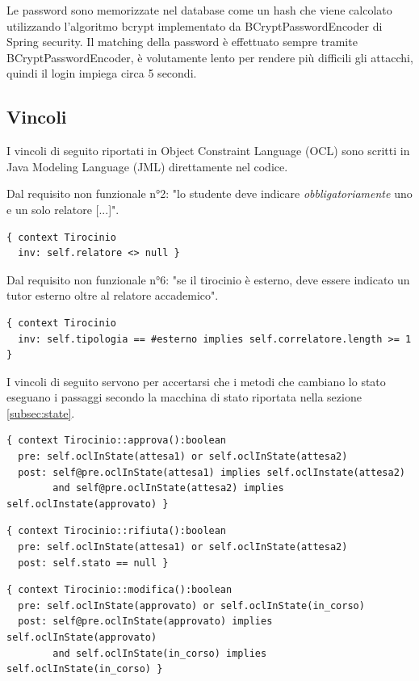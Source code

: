 \documentclass[12pt]{article}
\begin{document}
Le password sono memorizzate nel database come un hash che viene calcolato utilizzando l'algoritmo bcrypt implementato da BCryptPasswordEncoder di Spring security. Il matching della password è effettuato sempre tramite BCryptPasswordEncoder, è volutamente lento per rendere più difficili gli attacchi, quindi il login impiega circa 5 secondi.


\subsection{Vincoli}

I vincoli di seguito riportati in Object Constraint Language (OCL) sono scritti in Java Modeling Language (JML) direttamente nel codice.

Dal requisito non funzionale n°2: "lo studente deve indicare \emph{obbligatoriamente} uno e un solo relatore [...]".
\begin{verbatim}
{ context Tirocinio
  inv: self.relatore <> null }
\end{verbatim}

Dal requisito non funzionale n°6: "se il tirocinio è esterno, deve essere indicato un tutor esterno oltre al relatore accademico".
\begin{verbatim}
{ context Tirocinio
  inv: self.tipologia == #esterno implies self.correlatore.length >= 1 }
\end{verbatim}

I vincoli di seguito servono per accertarsi che i metodi che cambiano lo stato eseguano i passaggi secondo la macchina di stato riportata nella sezione \ref{subsec:state}.
\begin{verbatim}
{ context Tirocinio::approva():boolean
  pre: self.oclInState(attesa1) or self.oclInState(attesa2)
  post: self@pre.oclInState(attesa1) implies self.oclInstate(attesa2)
        and self@pre.oclInState(attesa2) implies self.oclInstate(approvato) }
\end{verbatim}

\begin{verbatim}
{ context Tirocinio::rifiuta():boolean
  pre: self.oclInState(attesa1) or self.oclInState(attesa2)
  post: self.stato == null }
\end{verbatim}

\begin{verbatim}
{ context Tirocinio::modifica():boolean
  pre: self.oclInState(approvato) or self.oclInState(in_corso)
  post: self@pre.oclInState(approvato) implies self.oclInState(approvato)
        and self.oclInState(in_corso) implies self.oclInState(in_corso) }
\end{verbatim}
\end{document}

